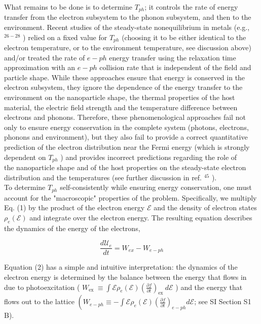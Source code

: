 \documentclass[10pt]{article}
\begin{document}
What remains to be done is to determine $T_{p h}$; it controls the rate of energy transfer from the electron subsystem to the phonon subsystem, and then to the environment. Recent studies of the steady-state nonequilibrium in metals (e.g., ${ }^{26-28}$ ) relied on a fixed value for $T_{p h}$ (choosing it to be either identical to the electron temperature, or to the environment temperature, see discussion above) and/or treated the rate of $e-p h$ energy transfer using the relaxation time approximation with an $e-p h$ collision rate that is independent of the field and particle shape. While these approaches ensure that energy is conserved in the electron subsystem, they ignore the dependence of the energy transfer to the environment on the nanoparticle shape, the thermal properties of the host material, the electric field strength and the temperature difference between electrons and phonons. Therefore, these phenomenological approaches fail not only to ensure energy conservation in the complete system (photons, electrons, phonons and environment), but they also fail to provide a correct quantitative prediction of the electron distribution near the Fermi energy (which is strongly dependent on $T_{p h}$ ) and provides incorrect predictions regarding the role of\\
the nanoparticle shape and of the host properties on the steady-state electron distribution and the temperatures (see further discussion in ref. ${ }^{45}$ ).\\
To determine $T_{p h}$ self-consistently while ensuring energy conservation, one must account for the "macroscopic" properties of the problem. Specifically, we multiply Eq. (1) by the product of the electron energy $\mathcal{E}$ and the density of electron states $\rho_{e}(\mathcal{E})$ and integrate over the electron energy. The resulting equation describes the dynamics of the energy of the electrons,


\begin{equation*}
\frac{d \mathcal{U}_{e}}{d t}=W_{e x}-W_{e-p h} \tag{2}
\end{equation*}


Equation (2) has a simple and intuitive interpretation: the dynamics of the electron energy is determined by the balance between the energy that flows in due to photoexcitation ( $W_{\text {ex }} \equiv \int \mathcal{E} \rho_{e}(\mathcal{E})\left(\frac{\partial f}{\partial t}\right)_{\text {ex }} d \mathcal{E}$ ) and the energy that flows out to the lattice $\left(W_{e-p h} \equiv-\int \mathcal{E} \rho_{e}(\mathcal{E})\left(\frac{\partial f}{\partial t}\right)_{e-p h} d \mathcal{E}\right.$; see SI Section S1 B).
\end{document}
